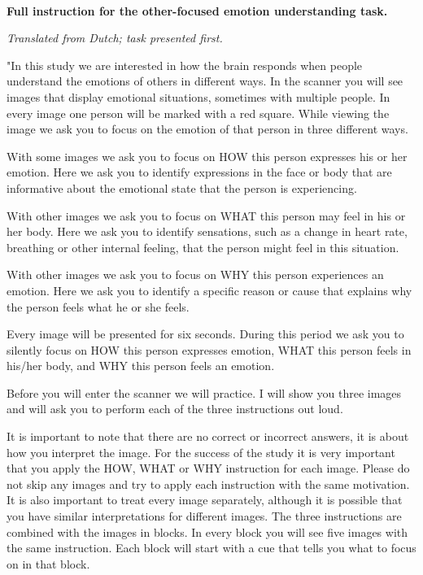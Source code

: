 \documentclass[11pt,american,a4paper,oneside,]{memoir} %
\begin{document}
~
~

\textbf{Full instruction for the other-focused emotion understanding task.}

\emph{Translated from Dutch; task presented first.}

"In this study we are interested in how the brain responds when people understand the emotions of others in different ways. In the scanner you will see images that display emotional situations, sometimes with multiple people. In every image one person will be marked with a red square. While viewing the image we ask you to focus on the emotion of that person in three different ways.

With some images we ask you to focus on HOW this person expresses his or her emotion. Here we ask you to identify expressions in the face or body that are informative about the emotional state that the person is experiencing.

With other images we ask you to focus on WHAT this person may feel in his or her body. Here we ask you to identify sensations, such as a change in heart rate, breathing or other internal feeling, that the person might feel in this situation.

With other images we ask you to focus on WHY this person experiences an emotion. Here we ask you to identify a specific reason or cause that explains why the person feels what he or she feels.

Every image will be presented for six seconds. During this period we ask you to silently focus on HOW this person expresses emotion, WHAT this person feels in his/her body, and WHY this person feels an emotion.

Before you will enter the scanner we will practice. I will show you three images and will ask you to perform each of the three instructions out loud.

It is important to note that there are no correct or incorrect answers, it is about how you interpret the image. For the success of the study it is very important that you apply the HOW, WHAT or WHY instruction for each image. Please do not skip any images and try to apply each instruction with the same motivation. It is also important to treat every image separately, although it is possible that you have similar interpretations for different images.
The three instructions are combined with the images in blocks. In every block you will see five images with the same instruction. Each block will start with a cue that tells you what to focus on in that block.
\end{document}
